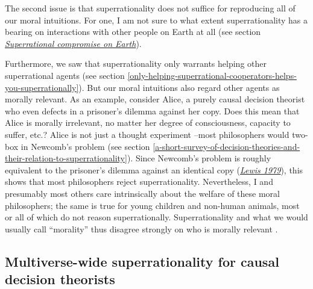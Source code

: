 The second issue is that superrationality does not suffice for
reproducing all of our moral intuitions. For one, I am not sure to what
extent superrationality has a bearing on interactions with other people
on Earth at all (see section
\protect\hyperlink{_hbp3s2xblhpq}{\emph{Superrational compromise on
Earth}}).

Furthermore, we saw that superrationality only warrants helping other
superrational agents (see section
\ref{only-helping-superrational-cooperators-helps-you-superrationally}). But
our moral intuitions also regard other agents as morally relevant. As an
example, consider Alice, a purely causal decision theorist who even
defects in a prisoner's dilemma against her copy. Does this mean that
Alice is morally irrelevant, no matter her degree of consciousness,
capacity to suffer, etc.? Alice is not just a thought experiment --most
philosophers would two-box in Newcomb's problem (see section
\ref{a-short-survey-of-decision-theories-and-their-relation-to-superrationality}). Since Newcomb's problem is roughly equivalent to
the prisoner's dilemma against an identical copy
(\href{https://sl4librarian.files.wordpress.com/2017/01/lewis-prisoners-dilemma-newcomb-problem.pdf}{\emph{Lewis
1979}}), this shows that most philosophers reject superrationality.
Nevertheless, I and presumably most others care intrinsically about the
welfare of these moral philosophers; the same is true for young children
and non-human animals, most or all of which do not reason
superrationally. Superrationality and what we would usually call
``morality'' thus disagree strongly on who is morally relevant
\parencite{Drescher2006-ky}.

\hypertarget{multiverse-wide-superrationality-for-causal-decision-theorists}{\subsection{Multiverse-wide
superrationality for causal decision
theorists}\label{multiverse-wide-superrationality-for-causal-decision-theorists}}

